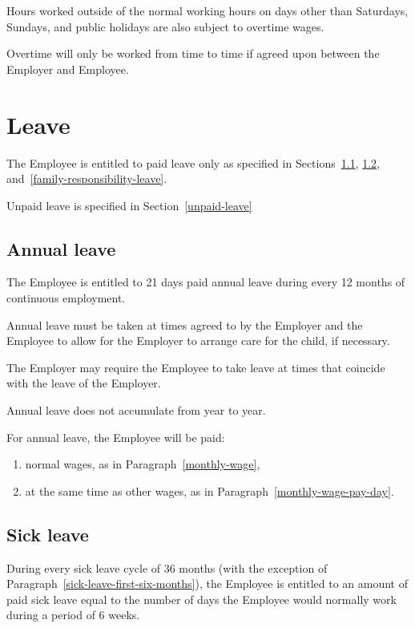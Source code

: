 \documentclass[a4paper,11pt]{article}
\begin{document}
\para Hours worked outside of the normal working hours on days other than
Saturdays, Sundays, and public holidays are also subject to overtime wages.

\para Overtime will only be worked from time to time if agreed upon between the
Employer and Employee.

\section{Leave}
\label{leave}

\para The Employee is entitled to paid leave only as specified in
Sections~\ref{annual-leave}, \ref{sick-leave},
and~\ref{family-responsibility-leave}.

\para Unpaid leave is specified in Section~\ref{unpaid-leave}

\subsection{Annual leave}
\label{annual-leave}

\para The Employee is entitled to 21 days paid annual leave during every 12
months of continuous employment.

\para Annual leave must be taken at times agreed to by the Employer and the
Employee to allow for the Employer to arrange care for the child, if necessary.

\para The Employer may require the Employee to take leave at times that
coincide with the leave of the Employer.

\para Annual leave does not accumulate from year to year.

\para For annual leave, the Employee will be paid:

\begin{enumerate}
  \item normal wages, as in Paragraph~\ref{monthly-wage},
  \item at the same time as other wages, as in
    Paragraph~\ref{monthly-wage-pay-day}.
\end{enumerate}

\subsection{Sick leave}
\label{sick-leave}

\para During every sick leave cycle of 36 months (with the exception of
Paragraph~\ref{sick-leave-first-six-months}), the Employee is entitled to an
amount of paid sick leave equal to the number of days the Employee would
normally work during a period of 6 weeks.
\end{document}
